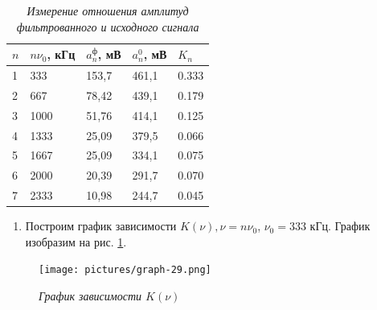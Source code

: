 \documentclass[a4paper,12pt]{article}
\begin{document}
\FloatBarrier
\begin{table}[!ht]
    \centering
    \caption{\textit{Измерение отношения амплитуд фильтрованного и исходного сигнала}}
    \begin{tabular}{|l|l|l|l|l|}
        \hline
        $n$ & $n \nu_0$, кГц & $a^\text{ф}_n$, мВ & $a^0_n$, мВ & $K_n$  \\ \hline
        1 & 333 & 153,7 & 461,1 & 0.333 \\ \hline
        2 & 667 & 78,42 & 439,1 & 0.179 \\ \hline
        3 & 1000 & 51,76 & 414,1 & 0.125 \\ \hline
        4 & 1333 & 25,09 & 379,5 & 0.066 \\ \hline
        5 & 1667 & 25,09 & 334,1 & 0.075 \\ \hline
        6 & 2000 & 20,39 & 291,7 & 0.070 \\ \hline
        7 & 2333 & 10,98 & 244,7 & 0.045 \\ \hline
    \end{tabular}
	\label{table:6}
\end{table}
\FloatBarrier

\begin{enumerate}[resume]
    \item Построим график зависимости $K(\nu), \nu = n \nu_0$, $\nu_0 = 333$ кГц. График изобразим на рис. \ref{graph:4}.
\end{enumerate}

\FloatBarrier
\begin{figure}[!ht]
        \centering
	\texttt{[image: pictures/graph-29.png]}
	\caption{\textit{График зависимости $K(\nu)$}}
	\label{graph:4}
\end{figure}
\FloatBarrier
\end{document}
